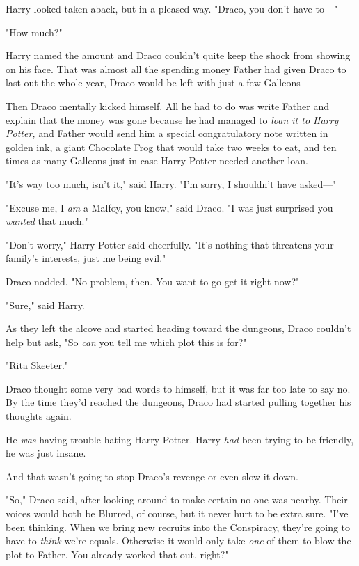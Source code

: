 Harry looked taken aback, but in a pleased way. "Draco, you don't have to---"

"How much?"

Harry named the amount and Draco couldn't quite keep the shock from showing on
his face. That was almost all the spending money Father had given Draco to last
out the whole year, Draco would be left with just a few Galleons---

Then Draco mentally kicked himself. All he had to do was write Father and
explain that the money was gone because he had managed to \emph{loan it to
Harry Potter,} and Father would send him a special congratulatory note written
in golden ink, a giant Chocolate Frog that would take two weeks to eat, and ten
times as many Galleons just in case Harry Potter needed another loan.

"It's way too much, isn't it," said Harry. "I'm sorry, I shouldn't have
asked---"

"Excuse me, I \emph{am} a Malfoy, you know," said Draco. "I was just surprised
you \emph{wanted} that much."

"Don't worry," Harry Potter said cheerfully. "It's nothing that threatens your
family's interests, just me being evil."

Draco nodded. "No problem, then. You want to go get it right now?"

"Sure," said Harry.

As they left the alcove and started heading toward the dungeons, Draco couldn't
help but ask, "So \emph{can} you tell me which plot this is for?"

"Rita Skeeter."

Draco thought some very bad words to himself, but it was far too late to say no.
\sbreak
By the time they'd reached the dungeons, Draco had started pulling together his
thoughts again.

He \emph{was} having trouble hating Harry Potter. Harry \emph{had} been trying
to be friendly, he was just insane.

And that wasn't going to stop Draco's revenge or even slow it down.

"So," Draco said, after looking around to make certain no one was nearby. Their
voices would both be Blurred, of course, but it never hurt to be extra sure.
"I've been thinking. When we bring new recruits into the Conspiracy, they're
going to have to \emph{think} we're equals. Otherwise it would only take
\emph{one} of them to blow the plot to Father. You already worked that out,
right?"

